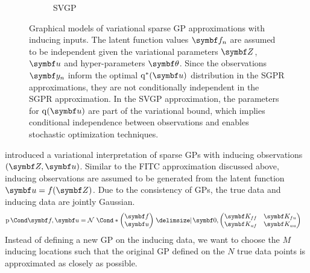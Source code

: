 \begin{figure}[t]
\begin{subfigure}[b]{\halffigurewidth}
        \medskip
        \caption{
            SVGP
            \label{fig:gp:sparse_graphical_model:svgp}
        }
    \end{subfigure}
    \caption[Graphical model: Variational sparse GP]{
        \label{fig:gp:sparse_graphical_model}
        Graphical models of variational sparse GP approximations with inducing inputs.
        The latent function values $\mat{f}_n$ are assumed to be independent given the variational parameters $\mat{Z}$, $\mat{u}$ and hyper-parameters $\mat{\theta}$.
        Since the observations $\mat{y}_n$ inform the optimal $\q^\ast(\mat{u})$ distribution in the SGPR approximations, they are not conditionally independent in the SGPR approximation.
        In the SVGP approximation, the parameters for $\q(\mat{u})$ are part of the variational bound, which implies conditional independence between observations and enables stochastic optimization techniques.
    }
\end{figure}
\Textcite{titsias_variational_2009} introduced a variational interpretation of sparse GPs with inducing observations $(\mat{Z}, \mat{u})$.
Similar to the FITC approximation discussed above, inducing observations are assumed to be generated from the latent function $\mat{u} = f(\mat{Z})$.
Due to the consistency of GPs, the true data and inducing data are jointly Gaussian.
\begin{align}
    \label{eq:gp:augmented_model}
    \Prob{\mat{f}, \mat{u}} & = \Gaussian*{\begin{pmatrix} \mat{f} \\ \mat{u}\end{pmatrix} \given \mat{0}, \begin{pmatrix} \mat{K_{ff}} & \mat{K_{fu}} \\ \mat{K_{uf}} & \mat{K_{uu}} \end{pmatrix}}
\end{align}
Instead of defining a new GP on the inducing data, we want to choose the $M$ inducing locations such that the original GP defined on the $N$ true data points is approximated as closely as possible.

